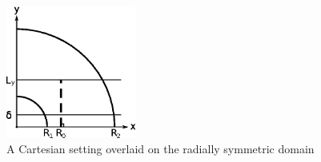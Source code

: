 \documentclass[letterpaper,11pt,nointlimits,reqno]{amsart}
\begin{document}
\begin{figure}[h]
  \centering
  \includegraphics[width=0.38\textwidth]{nozzle_schematic}
  \caption{
      \label{fig:mapping_geometry}
      A Cartesian setting overlaid on the radially symmetric domain
  }
\end{figure}
\end{document}
